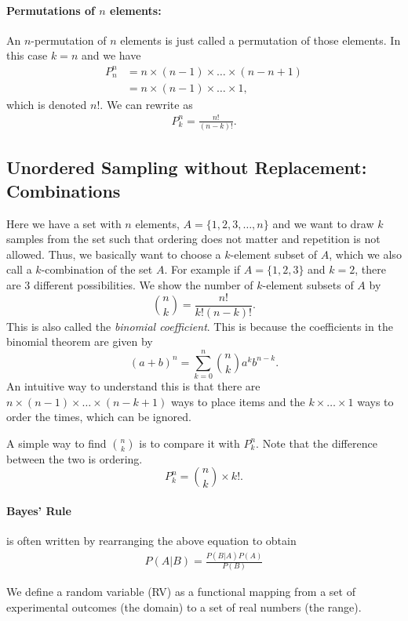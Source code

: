 \paragraph{Permutations of $n$ elements:} An $n$-permutation of $n$ elements is just called a permutation of those elements. In this case $k=n$ and we have
\begin{align*}
	P^n_n &= n\times (n-1)\times \dots \times (n-n+1)\\
		  &= n\times (n-1)\times \dots \times 1,
\end{align*}
which is denoted $n!$. We can rewrite as 
\begin{align*}
	P^n_k = \frac{n!}{(n-k)!}.
\end{align*}

\subsection{Unordered Sampling without Replacement: Combinations}
Here we have a set with $n$ elements, \eg $A=\{1,2,3,\dots, n\}$ and we want to draw $k$ samples from the set such that ordering does not matter and repetition is not allowed. Thus, we basically want to choose a $k$-element subset of $A$, which we also call a $k$-combination of the set $A$. For example if $A=\{1,2,3\}$ and $k=2$, there are 3 different possibilities. We show the number of $k$-element subsets of $A$ by
$$\binom{n}{k} = \frac{n!}{k!(n-k)!}.$$
This is also called the \textit{binomial coefficient}. This is because the coefficients in the binomial theorem are given by 
$$(a+b)^n = \sum_{k=0}^n\binom{n}{k}a^kb^{n-k}.$$
An intuitive way to understand this is that there are $n\times (n-1)\times \dots \times (n-k+1)$ ways to place items and the $k\times \dots \times 1$ ways to order the times, which can be ignored.  

A simple way to find $\binom{n}{k}$ is to compare it with $P_k^n$. Note that the difference between the two is ordering. 
$$P^n_k={n \choose k}\times k!.$$


\paragraph{Bayes' Rule }is often written by rearranging the above equation to obtain 
\begin{align*}
	P(A|B) = \frac{P(B|A)P(A)}{P(B)}
\end{align*}

We define a random variable (RV) as a functional mapping from a set of experimental outcomes (the domain) to a set of real numbers (the range).

